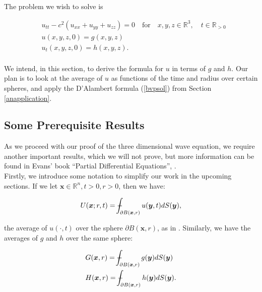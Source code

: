 \documentclass[a4paper, 12pt]{article}
\def\Xint#1{\mathchoice
{\XXint\displaystyle\textstyle{#1}}%
{\XXint\textstyle\scriptstyle{#1}}%
{\XXint\scriptstyle\scriptscriptstyle{#1}}%
{\XXint\scriptscriptstyle\scriptscriptstyle{#1}}%
\!\int}
\def\XXint#1#2#3{{\setbox0=\hbox{$#1{#2#3}{\int}$ }
\vcenter{\hbox{$#2#3$ }}\kern-.6\wd0}}
\def\dashint{\Xint-}
\numberwithin{equation}{section}
\begin{document}
The problem we wish to solve is

\begin{equation} \label{3deq}
\begin{aligned}
    &u_{tt}-c^2(u_{xx}+u_{yy}+u_{zz})=0 \quad \textrm {for} \quad x, y, z \in \mathbb{R}^3, \quad t \in \mathbb{R}_{>0}\\
    &u(x, y, z,0)=g(x,y,z)\\
    &u_t(x,y,z,0)=h(x,y,z).\\
\end{aligned}
\end{equation}

We intend, in this section, to derive the formula for $u$ in terms of $g$ and $h$. Our plan is to look at the average of $u$ as 
functions of the time and radius over certain spheres, and apply the D'Alambert formula (\ref{bvpsol}) from Section \ref{anapplication}.

\subsection{Some Prerequisite Results} \label{prereq}
As we proceed with our proof of the three dimensional wave equation, we require another important results, which we will not prove, but more information
can be found in Evans' book ``Partial Differential Equations'', \cite{Ev}.
\\

Firstly, we introduce some notation to simplify our work in the upcoming sections. If we let $\boldsymbol{x}\in \mathbb{R}^n, t>0, r>0$, then we have:

\begin{equation} \label{averageU}
    U(\boldsymbol{x};r,t)=\dashint_{\partial B(\boldsymbol{x},r)}u(\boldsymbol{y},t)dS(\boldsymbol{y}),
\end{equation}

the average of $u(\cdot,t)$ over the sphere $\partial B(\boldsymbol{x},r)$, as in \cite{Ev}. Similarly, we have the averages of $g$ and $h$ over the same sphere:

\begin{equation} \label{averageGH}
    \begin{aligned}
        &G(\boldsymbol{x},r)=\dashint_{\partial B(\boldsymbol{x},r)}g(\boldsymbol{y})dS(\boldsymbol{y})\\
        &H(\boldsymbol{x},r)=\dashint_{\partial B(\boldsymbol{x},r)}h(\boldsymbol{y})dS(\boldsymbol{y}).
    \end{aligned}
\end{equation}
\end{document}
